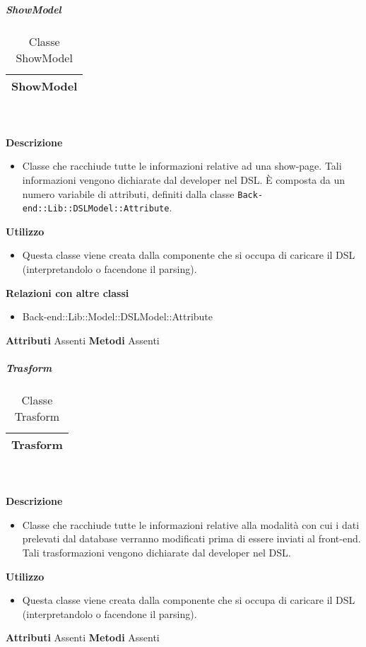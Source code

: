 			\subparagraph{ShowModel} 
\begin{table}[ht]
\begin{center}
\bgroup
	\setlength{\arrayrulewidth}{0.6mm}
	\def\arraystretch{1}
		\begin{tabular}{ | p{12cm} | }
				\hline  
					\centerline{\textbf{ShowModel}}
		\\ \hline 
				\hline
				\hline
		
		\end{tabular}
\egroup
\caption{Classe ShowModel}
\end{center}
\end{table} \textbf{\\ \\ Descrizione}
\begin{itemize}
\item[] Classe che racchiude tutte le informazioni relative ad una show-page. Tali informazioni vengono dichiarate dal developer nel DSL. È composta da un numero variabile di attributi, definiti dalla classe \texttt{Back-end::Lib::DSLModel::Attribute}.
\end{itemize} 
\textbf{Utilizzo}
\begin{itemize}
\item[] Questa classe viene creata dalla componente che si occupa di caricare il DSL (interpretandolo o facendone il parsing).
\end{itemize}
\textbf{Relazioni con altre classi}
\begin{itemize}
\item{Back-end::Lib::Model::DSLModel::Attribute}
\end{itemize}
\textbf{Attributi}
Assenti
\textbf{Metodi}
Assenti

			\subparagraph{Trasform} 
\begin{table}[ht]
\begin{center}
\bgroup
	\setlength{\arrayrulewidth}{0.6mm}
	\def\arraystretch{1}
		\begin{tabular}{ | p{12cm} | }
				\hline  
					\centerline{\textbf{Trasform}}
		\\ \hline 
				\hline
				\hline
		
		\end{tabular}
\egroup
\caption{Classe Trasform}
\end{center}
\end{table} \textbf{\\ \\ Descrizione}
\begin{itemize}
\item[] Classe che racchiude tutte le informazioni relative alla modalità con cui i dati prelevati dal database verranno modificati prima di essere inviati al front-end.
Tali trasformazioni vengono dichiarate dal developer nel DSL.
\end{itemize} 
\textbf{Utilizzo}
\begin{itemize}
\item[] Questa classe viene creata dalla componente che si occupa di caricare il DSL (interpretandolo o facendone il parsing).
\end{itemize}
\textbf{Attributi}
Assenti
\textbf{Metodi}
Assenti

